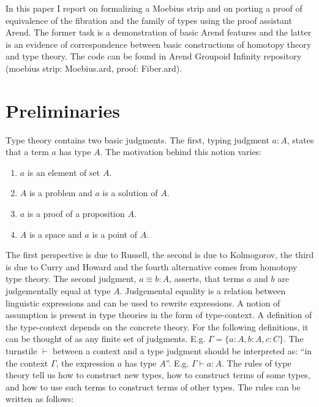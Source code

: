 In this paper I report on formalizing a Moebius strip and on porting a proof of equivalence of the fibration and the family of types using the proof assistant Arend. The former task is a demonstration of basic Arend features and the latter is an evidence of correspondence between basic constructions of homotopy theory and type theory. The code can be found in Arend Groupoid Infinity repository (moebius strip: Moebius.ard\autocite{Moebius}, proof: Fiber.ard\autocite{Fiber}).

\section{Preliminaries}

Type theory contains two basic judgments. The first, typing judgment $a : A$, states that a term $a$ has type $A$. The motivation behind this notion varies:
\begin{enumerate}
	\item $a$ is an element of set $A$.
	\item $A$ is a problem and $a$ is a solution of $A$.
	\item $a$ is a proof of a proposition $A$.
	\item $A$ is a space and $a$ is a point of $A$.
\end{enumerate}
The first perspective is due to Russell, the second is due to Kolmogorov, the third is due to Curry and Howard and the fourth alternative comes from homotopy type theory\autocite{Warren1}. 
The second judgment, $a \equiv b : A$, asserts, that terms $a$ and $b$ are judgementally equal at type $A$. Judgemental equality is a relation between linguistic expressions and can be used to rewrite expressions\autocite{hottbook}. A notion of assumption is present in type theories in the form of type-context.
A definition of the type-context depends on the concrete theory. For the following definitions, it can be thought of as any finite set of judgments. E.g. $\Gamma = \{a : A, b : A, c : C\}$. The turnstile $\vdash$ between a context and a type judgment should be interpreted as: ``in the context $\Gamma$, the expression $a$ has type $A$''. E.g. $\Gamma \vdash a : A$. The rules of type theory tell us how to construct new types, how to construct terms of some types, and how to use such terms to construct terms of other types. The rules can be written as follows:
\begin{prooftree}
\end{prooftree}
